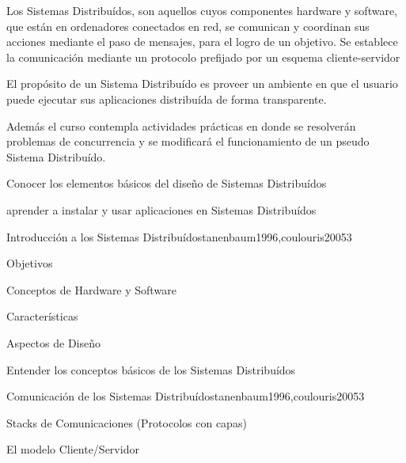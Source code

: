 \begin{syllabus}


\begin{justification}
Los Sistemas Distribuídos, son aquellos cuyos componentes hardware y software, que están en ordenadores conectados en red, se comunican y coordinan sus acciones mediante el paso de mensajes, para el logro de un objetivo. Se establece la comunicación mediante un protocolo prefijado por un esquema cliente-servidor

El propósito de un Sistema Distribuído es proveer un ambiente en que el usuario puede ejecutar sus aplicaciones distribuída de forma transparente.

Además el curso contempla actividades prácticas en donde se resolverán problemas de concurrencia y se modificará el funcionamiento de un pseudo Sistema Distribuído.
\end{justification}

\begin{goals}
\item Conocer los elementos básicos del diseño de Sistemas Distribuídos
\item aprender a instalar y usar aplicaciones en Sistemas Distribuídos
\end{goals}

\begin{outcomes}
\end{outcomes}

\begin{unit}{Introducción a los Sistemas Distribuídos}{tanenbaum1996,coulouris2005}{3}
   \begin{topics}
      \item Objetivos
      \item Conceptos de Hardware y Software
      \item Características
      \item Aspectos de Diseño
   \end{topics}

   \begin{learningoutcomes}
      \item Entender los conceptos básicos de los Sistemas Distribuídos
   \end{learningoutcomes}
\end{unit}

\begin{unit}{Comunicación de los Sistemas Distribuídos}{tanenbaum1996,coulouris2005}{3}
   \begin{topics}
      \item Stacks de Comunicaciones (Protocolos con capas)
      \item El modelo Cliente/Servidor
   \end{topics}


\end{unit}
\end{syllabus}
